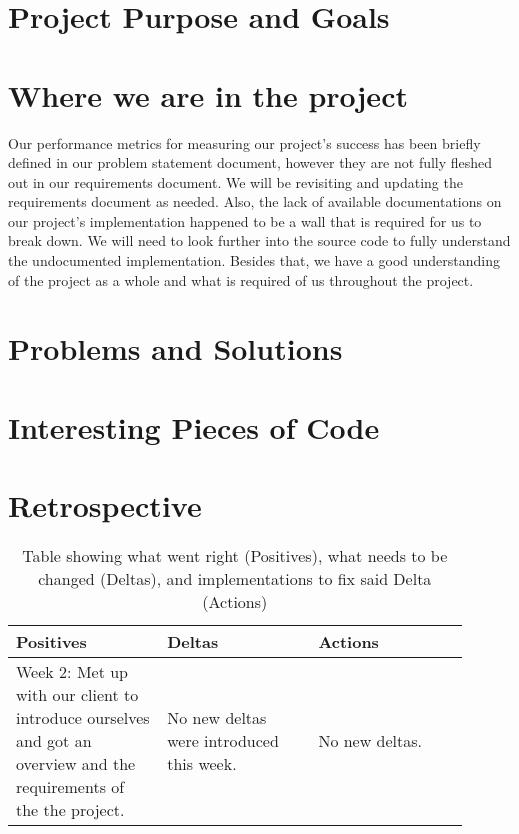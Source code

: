 \documentclass[10pt,journal,compsoc,draftclsnofoot]{IEEEtran}
\begin{document}
\begin{flushleft}

\section{Project Purpose and Goals}


\section{Where we are in the project}
Our performance metrics for measuring our project's success has been briefly defined in our problem statement document, however they are not fully fleshed out in our requirements document.
We will be revisiting and updating the requirements document as needed.
Also, the lack of available documentations on our project's implementation happened to be a wall that is required for us to break down.
We will need to look further into the source code to fully understand the undocumented implementation.
Besides that, we have a good understanding of the project as a whole and what is required of us throughout the project.

\section{Problems and Solutions}


\section{Interesting Pieces of Code}


\newpage

\section{Retrospective}

\begin{center}
\begin{table}[H]
\caption{Table showing what went right (Positives), what needs to be changed (Deltas), and implementations to fix said Delta (Actions)}
\begin{tabular}{ | p{0.3\linewidth} | p{0.3\linewidth} | p{0.3\linewidth} | }
\hline
\textbf{Positives}  & \textbf{Deltas}  & \textbf{Actions} \\ \hline

Week 2: Met up with our client to introduce ourselves and got an overview and the requirements of the the project. & 
No new deltas were introduced this week. & 
No new deltas. \\ \hline


\end{tabular}
\end{table}
\end{center}
\end{flushleft}
\end{document}

